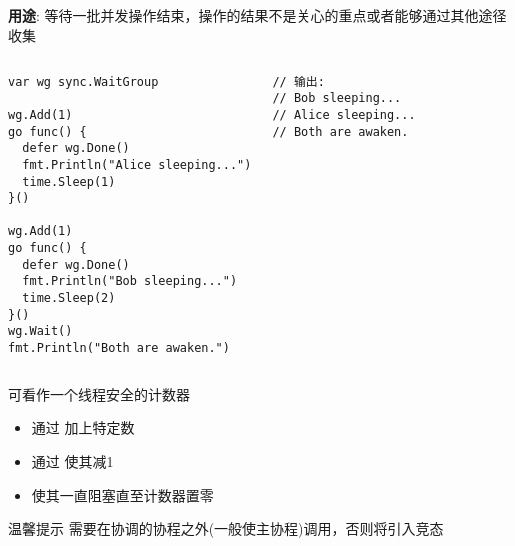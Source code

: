 \subsection{\WaitGroup}
\begin{frame}[fragile]{\WaitGroup}
   \textbf{用途}: 等待一批并发操作结束，\alert{操作的结果不是关心的重点或者能够通过其他途径收集} 

   \begin{columns}[t]
\begin{lstlisting}[xleftmargin=8pt]
var wg sync.WaitGroup

wg.Add(1)
go func() {
  defer wg.Done()
  fmt.Println("Alice sleeping...")
  time.Sleep(1)
}()

wg.Add(1)
go func() {
  defer wg.Done()
  fmt.Println("Bob sleeping...")
  time.Sleep(2)
}()
wg.Wait()
fmt.Println("Both are awaken.")
\end{lstlisting}

\begin{lstlisting}[firstnumber=last,xleftmargin=16pt]
// 输出:
// Bob sleeping...
// Alice sleeping...
// Both are awaken.
\end{lstlisting}
   \end{columns}
\end{frame}

\begin{frame}{\WaitGroup}
    \WaitGroup 可看作一个线程安全的计数器

    \begin{itemize}
        \item 通过 加上特定数
        \item 通过 使其减1
        \item {}使其一直阻塞直至计数器置零
    \end{itemize}

    \pause
    \begin{alertblock}{温馨提示}
        需要在\WaitGroup 协调的协程之外(一般使主协程)调用，否则将引入\alert{竞态}
    \end{alertblock}
\end{frame}